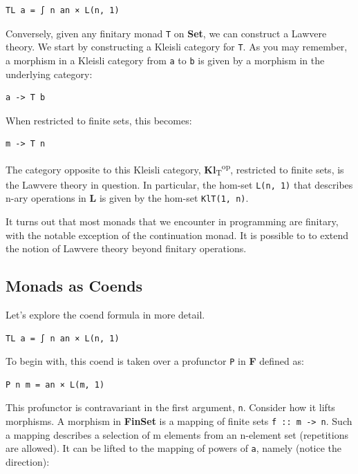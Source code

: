 \begin{verbatim}
TL a = ∫ n an × L(n, 1)
\end{verbatim}

Conversely, given any finitary monad \texttt{T} on \textbf{Set}, we can
construct a Lawvere theory. We start by constructing a Kleisli category
for \texttt{T}. As you may remember, a morphism in a Kleisli category
from \texttt{a} to \texttt{b} is given by a morphism in the underlying
category:

\begin{verbatim}
a -> T b
\end{verbatim}

When restricted to finite sets, this becomes:

\begin{verbatim}
m -> T n
\end{verbatim}

The category opposite to this Kleisli category,
\textbf{Kl}\textsubscript{T}\textsuperscript{op}, restricted to finite
sets, is the Lawvere theory in question. In particular, the hom-set
\texttt{L(n,\ 1)} that describes n-ary operations in \textbf{L} is given
by the hom-set \texttt{KlT(1,\ n)}.

It turns out that most monads that we encounter in programming are
finitary, with the notable exception of the continuation monad. It is
possible to to extend the notion of Lawvere theory beyond finitary
operations.

\subsection{Monads as Coends}\label{monads-as-coends}

Let's explore the coend formula in more detail.

\begin{verbatim}
TL a = ∫ n an × L(n, 1)
\end{verbatim}

To begin with, this coend is taken over a profunctor \texttt{P} in
\textbf{F} defined as:

\begin{verbatim}
P n m = an × L(m, 1)
\end{verbatim}

This profunctor is contravariant in the first argument, \texttt{n}.
Consider how it lifts morphisms. A morphism in \textbf{FinSet} is a
mapping of finite sets \texttt{f\ ::\ m\ -\textgreater{}\ n}. Such a
mapping describes a selection of m elements from an n-element set
(repetitions are allowed). It can be lifted to the mapping of powers of
\texttt{a}, namely (notice the direction):


